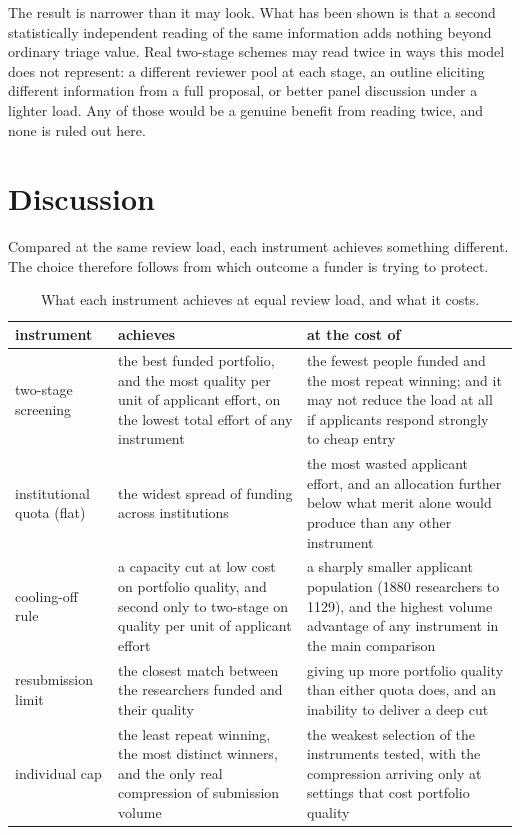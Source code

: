 \documentclass[11pt,a4paper]{article}
\begin{document}
The result is narrower than it may look. What has been shown is that a second
statistically independent reading of the same information adds nothing beyond
ordinary triage value. Real two-stage schemes may read twice in ways this model
does not represent: a different reviewer pool at each stage, an outline eliciting
different information from a full proposal, or better panel discussion under a
lighter load. Any of those would be a genuine benefit from reading twice, and
none is ruled out here.

\section{Discussion}

Compared at the same review load, each instrument achieves something different.
The choice therefore follows from which outcome a funder is trying to protect.

\begin{table}[!htbp]
\centering
\small
\caption{What each instrument achieves at equal review load, and what it costs.}
\begin{tabular}{p{3.1cm}p{5.7cm}p{5.9cm}}
\toprule
instrument & achieves & at the cost of \\
\midrule
two-stage screening
  & the best funded portfolio, and the most quality per unit of applicant
    effort, on the lowest total effort of any instrument
  & the fewest people funded and the most repeat winning; and it may not reduce
    the load at all if applicants respond strongly to cheap entry \\
institutional quota (flat)
  & the widest spread of funding across institutions
  & the most wasted applicant effort, and an allocation further below what merit
    alone would produce than any other instrument \\
cooling-off rule
  & a capacity cut at low cost on portfolio quality, and second only to
    two-stage on quality per unit of applicant effort
  & a sharply smaller applicant population (1880 researchers to 1129), and the
    highest volume advantage of any instrument in the main comparison \\
resubmission limit
  & the closest match between the researchers funded and their quality
  & giving up more portfolio quality than either quota does, and an inability to
    deliver a deep cut \\
individual cap
  & the least repeat winning, the most distinct winners, and the only real
    compression of submission volume
  & the weakest selection of the instruments tested, with the compression
    arriving only at settings that cost portfolio quality \\
\bottomrule
\end{tabular}
\end{table}
\end{document}
